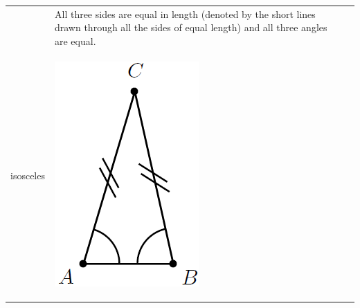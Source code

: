 \begin{center}
\begin{xtabular*}{\mytablewidth}[t]{|p{10\mystarwidth}|p{10\mystarwidth}|p{10\mystarwidth}|}
\begin{center}
      \vspace{2pt}
    \vspace{.1in}
    
    \end{center}



    \addtocounter{footnote}{-0}
    
                 &
    
    
        All three sides are equal in length (denoted by the short lines drawn through all the sides of equal length) and all three angles are equal.%
     \tabularnewline{}
    
    
        isosceles &
    
    
        
                  
    \setcounter{subfigure}{0}

\label{m39368*id317593}
    \begin{center}
    \label{m39368*id317593!!!underscore!!!media}\label{m39368*id317593!!!underscore!!!printimage}\includegraphics[width=.2\columnwidth]{col11306.imgs/m39368_MG10C13_024.png} %
        
      \vspace{2pt}
    \vspace{.1in}
    

\end{center}
\end{xtabular*}
\end{center}
